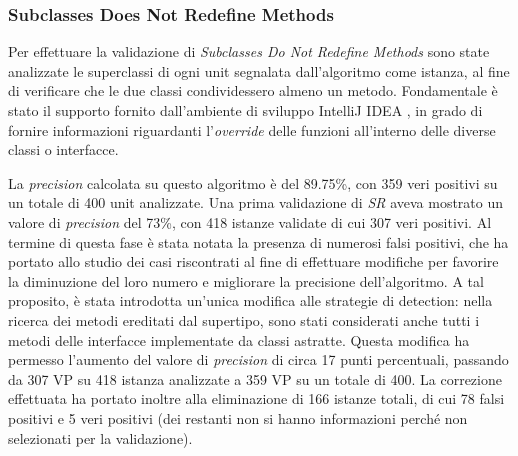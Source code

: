 \subsubsection{Subclasses Does Not Redefine Methods}
        Per effettuare la validazione di \textit{Subclasses Do Not Redefine Methods} sono state analizzate le superclassi di ogni unit segnalata dall'algoritmo come istanza, al fine di verificare che le due classi condividessero almeno un metodo. Fondamentale è stato il supporto fornito dall'ambiente di sviluppo IntelliJ IDEA \cite{intelliJ}, in grado di fornire informazioni riguardanti l'\textit{override} delle funzioni all'interno delle diverse classi o interfacce. 
        
        La \textit{precision} calcolata su questo algoritmo è del 89.75\%, con 359 veri positivi su un totale di 400 unit analizzate.
        Una prima validazione di \textit{SR} aveva mostrato un valore di \textit{precision} del 73\%, con 418 istanze validate di cui 307 veri positivi.
        Al termine di questa fase è stata notata la presenza di numerosi falsi positivi, che ha portato allo studio dei casi riscontrati al fine di effettuare modifiche per favorire la diminuzione del loro numero e migliorare la precisione dell'algoritmo.
        A tal proposito, è stata introdotta un'unica modifica alle strategie di detection: nella ricerca dei metodi ereditati dal supertipo, sono stati considerati anche tutti i metodi delle interfacce implementate da classi astratte.
        Questa modifica ha permesso l'aumento del valore di \textit{precision} di circa 17 punti percentuali, passando da 307 VP su 418 istanza analizzate a 359 VP su un totale di 400. La correzione effettuata ha portato inoltre alla eliminazione di 166 istanze totali, di cui 78 falsi positivi e 5 veri positivi (dei restanti non si hanno informazioni perché non selezionati per la validazione).
        
